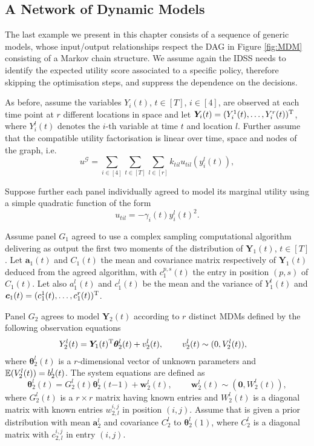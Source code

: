 \subsection{A Network of Dynamic Models}
The last example we present in this chapter consists of a sequence of generic models, whose input/output relationships respect the DAG in Figure \ref{fig:MDM} consisting of a Markov chain structure. We assume again the IDSS needs to identify the expected utility score associated to a specific policy, therefore skipping the optimisation steps, and suppress the dependence on the decisions. 

As before, assume the variables $Y_i(t)$, $t\in[T]$, $i\in[4]$, are observed at each time point at $r$ different locations in space and let $\bm{Y}_i(t)=(Y^1_i(t),\dots, Y_i^r(t))^{\textnormal{T}}$, where $Y^l_i(t)$ denotes the $i$-th variable at time $t$ and location $l$. Further assume that the compatible utility factorisation is linear over time, space and nodes of the graph, i.e.
\[
u^{\mathcal{G}}=\sum_{i\in[4]}\sum_{t\in[T]}\sum_{l\in[r]} k_{til}u_{til}(y_{i}^l(t)),
\]

Suppose further each panel individually agreed to model its marginal utility using a simple quadratic function of the  form 
\[
u_{til}=-\gamma_i(t)y_i^l(t)^2.
\] 

Assume panel $G_1$ agreed to use a complex sampling computational algorithm delivering as output the first two moments of the distribution of $\bm{Y}_1(t)$, $t\in[T]$. Let $\bm{a}_1(t)$ and $C_1(t)$ the mean and covariance matrix respectively of $\bm{Y}_1(t)$ deduced from the agreed algorithm, with $c_1^{p,s}(t)$ the entry in position $(p,s)$ of $C_1(t)$. Let also $a_1^l(t)$ and $c_1^l(t)$ be the mean and the variance of $Y_1^l(t)$ and $\bm{c}_1(t)=(c_1^1(t),\dots,c_1^r(t))^{\textnormal{T}}$.

 Panel $G_2$ agrees to model $\bm{Y}_2(t)$ according to $r$ distinct MDMs defined by the following observation equations
\begin{align*}
&Y_2^l(t)=\bm{Y}_1(t)^{\textnormal{T}}\bm{\theta}_2^l(t) +v_2^l(t),\;\;\;\;\;\;\;\;v_2^l(t)\sim (0,V^l_2(t)),
\end{align*}
where $\bm{\theta}_2^l(t)$ is a $r$-dimensional vector of unknown parameters and $\mathbb{E}(V_2^l(t))=b_2^l(t)$. The system equations  are defined as
\[
\bm{\theta}_2^l(t)=G_{2}^l(t)\bm{\theta}_{2}^l(t{-1})+\bm{w}_{2}^l(t),\;\;\;\;\;\;\;\;\bm{w}_{2}^l(t)\sim (\bm{0},W_{2}^l(t)),
\]
where $G_{2}^l(t)$ is a $r\times r$ matrix having known entries and $W_{2}^l(t)$ is a diagonal matrix with known entries $w_{2,l}^{i,j}$ in position $(i,j)$. Assume that is given a prior distribution with mean $\bm{a}_2^{l}$ and covariance $C_{2}^l$ to $\bm{\theta}_2^l(1)$, where $C_{2}^l$ is a diagonal matrix with $c_{2,l}^{i,j}$ in entry $(i,j)$.

